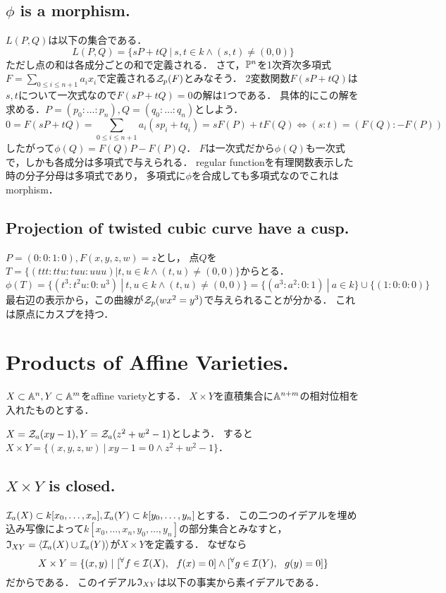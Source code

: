 \documentclass[a4paper]{jarticle}
\begin{document}
    \subsection{$\phi$ is a morphism.}
    $L(P,Q)$は以下の集合である．
    \[ L(P,Q)=\{ sP+tQ ~|~ s,t \in k \land (s,t) \neq (0,0) \} \]
    ただし点の和は各成分ごとの和で定義される．
    さて，$\mathbb{P}^n$を1次斉次多項式$F=\sum_{0 \leq i \leq n+1}{a_i x_i}$で定義される$\mathcal{Z}_p(F)$とみなそう．
    2変数関数$F(s P+t Q)$は$s,t$について一次式なので$F(s P+t Q)=0$の解は1つである．
    具体的にこの解を求める．$P=(p_0:\dots:p_n), Q=(q_0:\dots:q_n)$としよう．
    \[ 0=F(sP+tQ)=\sum_{0 \leq i \leq n+1}{a_i (sp_i+tq_i)}=s F(P)+t F(Q) \iff (s:t)=(F(Q):-F(P)) \]
    したがって$\phi(Q)=F(Q) P-F(P) Q$．
    $F$は一次式だから$\phi(Q)$も一次式で，しかも各成分は多項式で与えられる．
    regular functionを有理関数表示した時の分子分母は多項式であり，
    多項式に$\phi$を合成しても多項式なのでこれはmorphism．

    \subsection{Projection of twisted cubic curve have a cusp.}
    $P=(0:0:1:0), F(x,y,z,w)=z$とし，
    点$Q$を$T=\{(ttt:ttu:tuu:uuu) | t,u \in k \land (t,u) \neq (0,0)\}$からとる．
    \[ \phi(T)=\{ (t^3:t^2u:0:u^3) ~|~ t,u \in k \land (t,u) \neq (0,0) \}=\{ (a^3:a^2:0:1) ~|~ a \in k \} \cup \{(1:0:0:0)\} \]
    最右辺の表示から，この曲線が$\mathcal{Z}_p(wx^2=y^3)$で与えられることが分かる．
    これは原点にカスプを持つ．

\section{Products of Affine Varieties.} 
    $X \subset \mathbb{A}^n, Y \subset \mathbb{A}^m$をaffine varietyとする．
    $X \times Y$を直積集合に$\mathbb{A}^{n+m}$の相対位相を入れたものとする．

    \begin{Example}
    $X=\mathcal{Z}_a(xy-1), Y=\mathcal{Z}_a(z^2+w^2-1)$としよう．
    すると$X \times Y=\{(x,y,z,w) ~|~ xy-1=0 \land z^2+w^2-1 \}$．
    \end{Example}

    \subsection{$X \times Y$ is closed.}
    $\mathcal{I}_a(X) \subset k[x_{0},\dots,x_{n}], \mathcal{I}_a(Y) \subset k[y_{0},\dots,y_{n}]$とする．
    この二つのイデアルを埋め込み写像によって$k[x_{0},\dots,x_{n},y_{0},\dots,y_{n}]$の部分集合とみなすと，
    $\mathfrak{I}_{XY}=\langle \mathcal{I}_a(X) \cup \mathcal{I}_a(Y) \rangle$が$X \times Y$を定義する．
    なぜなら
    \[ X \times Y=\{ (x,y) ~|~ [{}^{\forall} f \in \mathcal{I}(X),~~ f(x)=0] \land [{}^{\forall} g \in \mathcal{I}(Y),~~ g(y)=0] \} \]
    だからである．
    このイデアル$\mathfrak{I}_{XY}$は以下の事実から素イデアルである．
\end{document}
